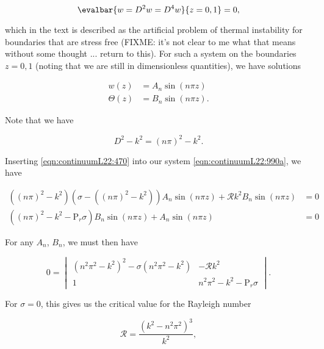 \begin{equation}\label{eqn:continuumL22:590}
\evalbar{w = D^2 w = D^4 w}{z = 0, 1} = 0,
\end{equation}

which in the text is described as the artificial problem of thermal instability for boundaries that are stress free (FIXME: it's not clear to me what that means without some thought ... return to this).  For such a system on the boundaries $z = 0, 1$ (noting that we are still in dimensionless quantities), we have solutions

\begin{align}\label{eqn:continuumL22:470}
w(z) &= A_n \sin\left( n \pi z \right) \\
\Theta(z) &= B_n \sin\left( n \pi z \right).
\end{align}

Note that we have

\begin{equation}\label{eqn:continuumL22:1090}
D^2 - k^2 = \left( n \pi \right)^2 - k^2.
\end{equation}

Inserting \ref{eqn:continuumL22:470} into our system \ref{eqn:continuumL22:990a}, we have

\begin{align}\label{eqn:continuumL22:1110}
\left( \left( n \pi \right)^2 - k^2 \right)
\left( \sigma - 
\left( \left( n \pi \right)^2 - k^2 \right)
\right) A_n 
\sin\left( n \pi z \right)
+ \mathcal{R} k^2 B_n 
\sin\left( n \pi z \right)
&= 0 \\
\left( \left( n \pi \right)^2 - k^2 - \text{P}_r \sigma \right) B_n 
\sin\left( n \pi z \right)
+ A_n 
\sin\left( n \pi z \right)
&= 0
\end{align}

For any $A_n$, $B_n$, we must then have

\begin{equation}\label{eqn:continuumL22:490}
0 = 
\begin{vmatrix}
\left( n^2 \pi^2 - k^2 \right)^2 - \sigma \left( n^2 \pi^2 - k^2\right) & -\mathcal{R} k^2 \\
1 & n^2 \pi^2 - k^2 - \text{P}_r \sigma
\end{vmatrix}.
\end{equation}

For $\sigma = 0$, this gives us the critical value for the Rayleigh number

\begin{equation}\label{eqn:continuumL22:510}
\mathcal{R} = \frac{(k^2 - n^2 \pi^2)^3}{k^2},
\end{equation}

